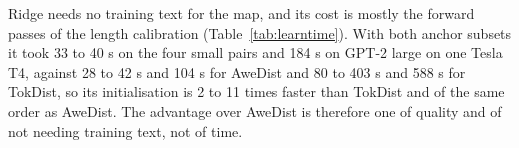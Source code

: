 \documentclass[preprint,12pt]{elsarticle}
\begin{document}
Ridge needs no training text for the map, and its cost is mostly the forward passes of the length calibration (Table~\ref{tab:learntime}). With both anchor subsets it took 33 to 40 s on the four small pairs and 184 s on GPT-2 large on one Tesla T4, against 28 to 42 s and 104 s for AweDist and 80 to 403 s and 588 s for TokDist, so its initialisation is 2 to 11 times faster than TokDist and of the same order as AweDist. The advantage over AweDist is therefore one of quality and of not needing training text, not of time.
\begin{table}[t]
\centering\small
\caption{Wall-clock time of the initialisation step (seconds, one Tesla T4, PubMed seed 1). Ridge = mapping and length calibration for both anchor subsets; AweDist = the official script; TokDist = our training including the learning-rate choice. The last column is the ridge variant selected by the training objective.}
\label{tab:learntime}
\resizebox{0.8\textwidth}{!}{}
\end{table}
\end{document}
